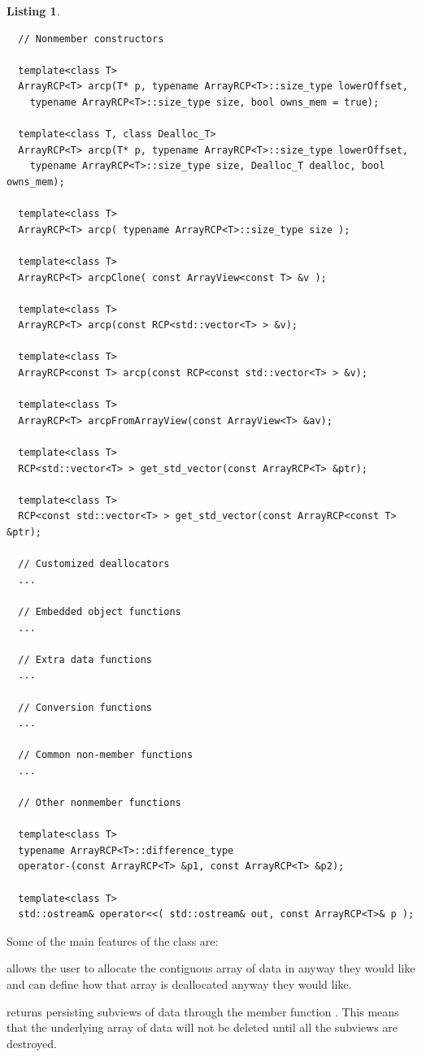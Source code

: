 \documentclass[pdf,ps2pdf,11pt]{SANDreport}
\newtheorem{listing}{Listing}
\begin{document}
\begin{listing}
{\begin{verbatim}
  // Nonmember constructors
  
  template<class T>
  ArrayRCP<T> arcp(T* p, typename ArrayRCP<T>::size_type lowerOffset,
    typename ArrayRCP<T>::size_type size, bool owns_mem = true);
  
  template<class T, class Dealloc_T>
  ArrayRCP<T> arcp(T* p, typename ArrayRCP<T>::size_type lowerOffset,
    typename ArrayRCP<T>::size_type size, Dealloc_T dealloc, bool owns_mem);
  
  template<class T>
  ArrayRCP<T> arcp( typename ArrayRCP<T>::size_type size );
  
  template<class T>
  ArrayRCP<T> arcpClone( const ArrayView<const T> &v );
  
  template<class T>
  ArrayRCP<T> arcp(const RCP<std::vector<T> > &v);
  
  template<class T>
  ArrayRCP<const T> arcp(const RCP<const std::vector<T> > &v);
  
  template<class T>
  ArrayRCP<T> arcpFromArrayView(const ArrayView<T> &av);
  
  template<class T>
  RCP<std::vector<T> > get_std_vector(const ArrayRCP<T> &ptr);
  
  template<class T>
  RCP<const std::vector<T> > get_std_vector(const ArrayRCP<const T> &ptr);

  // Customized deallocators
  ...

  // Embedded object functions
  ...

  // Extra data functions
  ...

  // Conversion functions
  ...

  // Common non-member functions
  ...

  // Other nonmember functions
  
  template<class T>
  typename ArrayRCP<T>::difference_type
  operator-(const ArrayRCP<T> &p1, const ArrayRCP<T> &p2);
  
  template<class T>
  std::ostream& operator<<( std::ostream& out, const ArrayRCP<T>& p );
\end{verbatim}}
\end{listing}

Some of the main features of the {} class are:

{} allows the user to allocate the contiguous array of data in
anyway they would like and can define how that array is deallocated anyway
they would like.

{} returns persisting subviews of data through the member
function {}.  This means that the underlying array of
data will not be deleted until all the subviews are destroyed.
\end{document}
